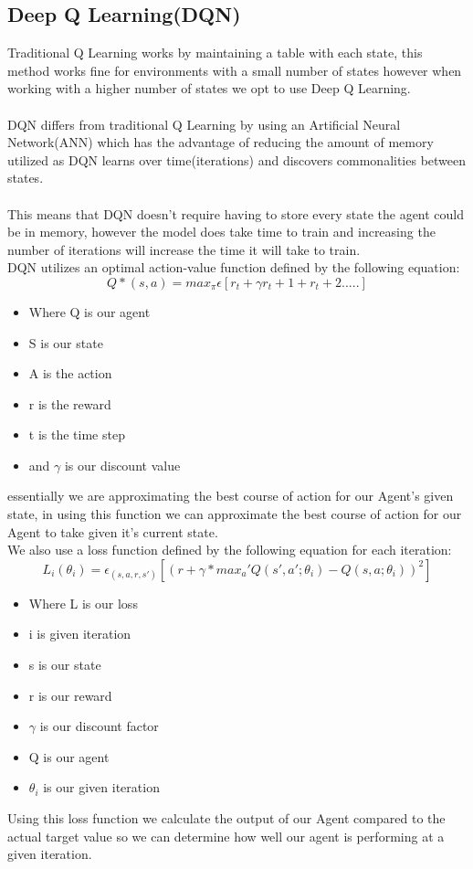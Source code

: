 \documentclass[conference]{IEEEtran}
\begin{document}
\subsection{Deep Q Learning(DQN)}
Traditional Q Learning works by maintaining a table with each state, this method works fine for environments with a small number of states however when working with a higher number of states we opt to use Deep Q Learning. 
\\
\\
DQN differs from traditional Q Learning by using an Artificial Neural Network(ANN) which has the advantage of reducing the amount of memory utilized as DQN learns over time(iterations) and discovers commonalities between states.  
\\
\\
This means that DQN doesn't require having to store every state the agent could be in memory, however the model does take time to train and increasing the number of iterations will increase the time it will take to train.
\\
DQN utilizes an optimal action-value function defined by the following equation:\[Q*(s,a)=max_\pi\epsilon[r_t + \gamma r_t+1 + r_t+2 .....]\]\cite{DQNPaper} 
\begin{itemize}
    \item Where Q is our agent
    \item S is our state
    \item A is the action
    \item r is the reward
    \item t is the time step 
    \item and $\gamma$ is our discount value
\end{itemize}
essentially we are approximating the best course of action for our Agent's given state, in using this function we can approximate the best course of action for our Agent to take given it's current state.
\\
We also use a loss function defined by the following equation for each iteration: \[L_i(\theta_i)=\epsilon_(s,a,r,s')[(r+\gamma*max_a'Q(s',a';\theta_i) - Q(s,a;\theta_i))^2]\]\cite{DQNPaper}
\begin{itemize}
    \item Where L is our loss
    \item i is given iteration
    \item s is our state
    \item r is our reward
    \item $\gamma$ is our discount factor
    \item Q is our agent
    \item $\theta_i$ is our given iteration
\end{itemize}
Using this loss function we calculate the output of our Agent compared to the actual target value so we can determine how well our agent is performing at a given iteration.
\end{document}
